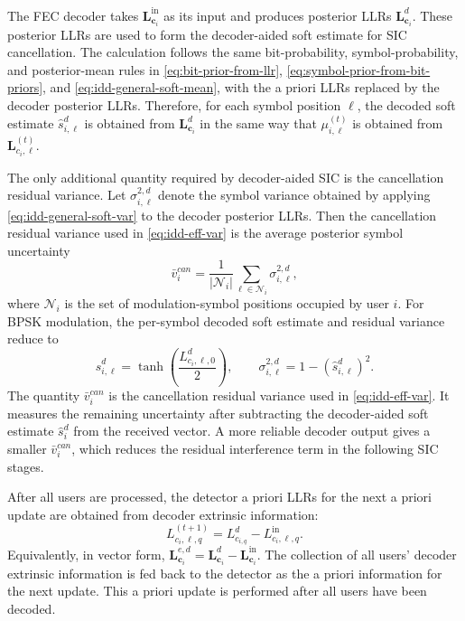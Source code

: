 The FEC decoder takes $\bm{L}^{\mathrm{in}}_{\bm{c}_i}$ as its input and produces posterior LLRs $\bm{L}^{d}_{\bm{c}_i}$. These posterior LLRs are used to form the decoder-aided soft estimate for SIC cancellation. The calculation follows the same bit-probability, symbol-probability, and posterior-mean rules in \eqref{eq:bit-prior-from-llr}, \eqref{eq:symbol-prior-from-bit-priors}, and \eqref{eq:idd-general-soft-mean}, with the a priori LLRs replaced by the decoder posterior LLRs. Therefore, for each symbol position $\ell$, the decoded soft estimate $\hat{s}^{d}_{i,\ell}$ is obtained from $\bm{L}^{d}_{\bm{c}_i}$ in the same way that $\mu^{(t)}_{i,\ell}$ is obtained from $\bm{L}^{(t)}_{c_i,\ell}$.

The only additional quantity required by decoder-aided SIC is the cancellation residual variance. Let $\sigma^{2,d}_{i,\ell}$ denote the symbol variance obtained by applying \eqref{eq:idd-general-soft-var} to the decoder posterior LLRs. Then the cancellation residual variance used in \eqref{eq:idd-eff-var} is the average posterior symbol uncertainty
\begin{equation}
    \bar{v}_i^{can}
    =
    \frac{1}{|\mathcal{N}_i|}
    \sum_{\ell\in\mathcal{N}_i}
    \sigma^{2,d}_{i,\ell},
    \label{eq:decoder-cancellation-residual-var}
\end{equation}
where $\mathcal{N}_i$ is the set of modulation-symbol positions occupied by user $i$. For BPSK modulation, the per-symbol decoded soft estimate and residual variance reduce to
\begin{equation}
    \hat{s}^{d}_{i,\ell}
    =
    \tanh\left(\frac{L^d_{c_i,\ell,0}}{2}\right),
    \qquad
    \sigma^{2,d}_{i,\ell}
    =
    1-\left(\hat{s}^{d}_{i,\ell}\right)^2 .
    \label{eq:bpsk-decoder-soft-estimate}
\end{equation}
The quantity $\bar{v}_i^{can}$ is the cancellation residual variance used in \eqref{eq:idd-eff-var}. It measures the remaining uncertainty after subtracting the decoder-aided soft estimate $\hat{s}^d_i$ from the received vector. A more reliable decoder output gives a smaller $\bar{v}_i^{can}$, which reduces the residual interference term in the following SIC stages.

After all users are processed, the detector a priori LLRs for the next a priori update are obtained from decoder extrinsic information:
\begin{equation}
    L^{(t+1)}_{c_i,\ell,q}
    =
    L^{d}_{c_{i,q}}
    -
    L^{\mathrm{in}}_{c_i,\ell,q}.
    \label{eq:decoder-extrinsic-feedback}
\end{equation}
Equivalently, in vector form, $\bm{L}^{e,d}_{\bm{c}_i}=\bm{L}^{d}_{\bm{c}_i}-\bm{L}^{\mathrm{in}}_{\bm{c}_i}$. The collection of all users' decoder extrinsic information is fed back to the detector as the a priori information for the next update. This a priori update is performed after all users have been decoded.

